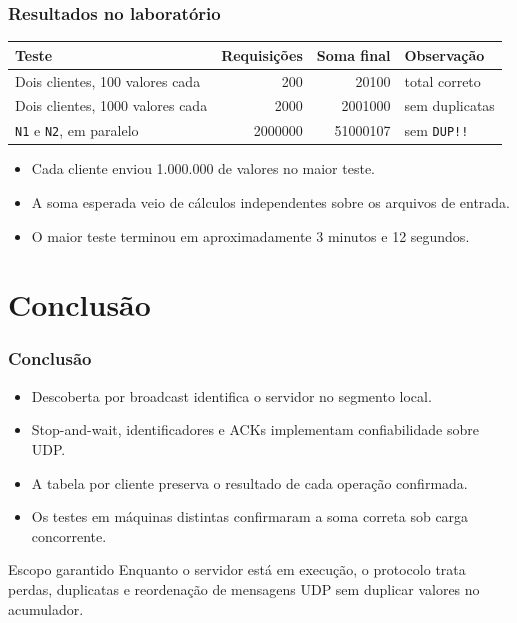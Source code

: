 \documentclass{beamer}
\begin{document}
\begin{frame}
  \frametitle{Resultados no laboratório}
  \small
  \begin{center}
    \begin{tabular}{@{}lrrl@{}}
      \toprule
      Teste & Requisições & Soma final & Observação \\
      \midrule
      Dois clientes, 100 valores cada & 200 & 20100 & total correto \\
      Dois clientes, 1000 valores cada & 2000 & 2001000 & sem duplicatas \\
      \texttt{N1} e \texttt{N2}, em paralelo & 2000000 & 51000107 & sem \texttt{DUP!!} \\
      \bottomrule
    \end{tabular}
  \end{center}

  \vspace{1em}
  \begin{itemize}
    \item Cada cliente enviou 1.000.000 de valores no maior teste.
    \item A soma esperada veio de cálculos independentes sobre os arquivos de entrada.
    \item O maior teste terminou em aproximadamente 3 minutos e 12 segundos.
  \end{itemize}
\end{frame}

\section{Conclusão}

\begin{frame}
  \frametitle{Conclusão}
  \begin{itemize}
    \item Descoberta por broadcast identifica o servidor no segmento local.
    \item Stop-and-wait, identificadores e ACKs implementam confiabilidade sobre UDP.
    \item A tabela por cliente preserva o resultado de cada operação confirmada.
    \item Os testes em máquinas distintas confirmaram a soma correta sob carga concorrente.
  \end{itemize}

  \vspace{1em}
  \begin{block}{Escopo garantido}
    Enquanto o servidor está em execução, o protocolo trata perdas, duplicatas e reordenação de mensagens UDP sem duplicar valores no acumulador.
  \end{block}
\end{frame}
\end{document}
